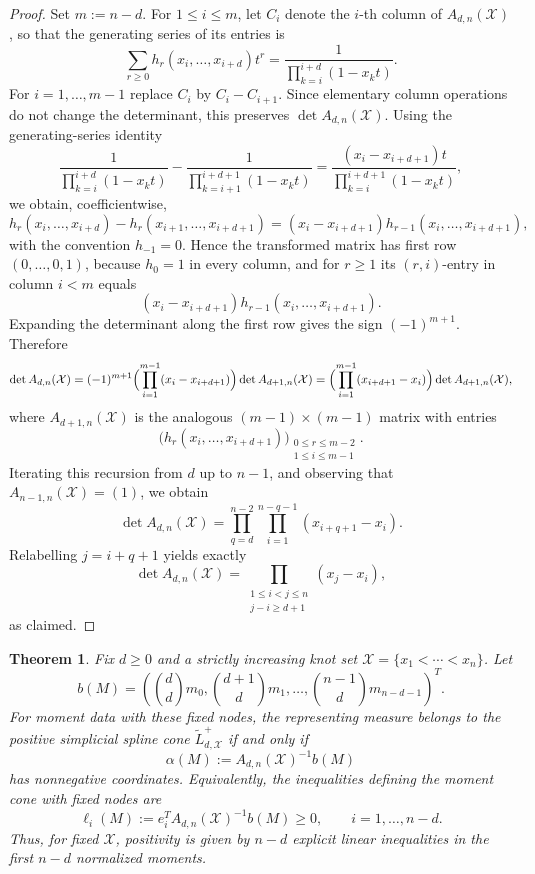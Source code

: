 \documentclass[reqno]{amsart}
\newtheorem{theorem}{Theorem}
\numberwithin{theorem}{section}
\newcommand{\cX}{\mathcal{X}}
\begin{document}
\begin{proof}
Set $m:=n-d$. For $1\le i\le m$, let $C_i$ denote the $i$-th column of $A_{d,n}(\cX)$, so that the generating series of its entries is
\[
\sum_{r\ge 0} h_r(x_i,\dots,x_{i+d})t^r
=
\frac{1}{\prod_{k=i}^{i+d}(1-x_kt)}.
\]
For $i=1,\dots,m-1$ replace $C_i$ by $C_i-C_{i+1}$. Since elementary column operations do not change the determinant, this preserves $\det A_{d,n}(\cX)$. Using the generating-series identity
\[
\frac{1}{\prod_{k=i}^{i+d}(1-x_kt)}-\frac{1}{\prod_{k=i+1}^{i+d+1}(1-x_kt)}
=
\frac{(x_i-x_{i+d+1})t}{\prod_{k=i}^{i+d+1}(1-x_kt)},
\]
we obtain, coefficientwise,
\[
 h_r(x_i,\dots,x_{i+d})-h_r(x_{i+1},\dots,x_{i+d+1})
 =(x_i-x_{i+d+1})h_{r-1}(x_i,\dots,x_{i+d+1}),
\]
with the convention $h_{-1}=0$.
Hence the transformed matrix has first row $(0,\dots,0,1)$, because $h_0=1$ in every column, and for $r\ge 1$ its $(r,i)$-entry in column $i<m$ equals
\[
(x_i-x_{i+d+1})h_{r-1}(x_i,\dots,x_{i+d+1}).
\]
Expanding the determinant along the first row gives the sign $(-1)^{m+1}$.  Therefore
\[
\det A_{d,n}(\cX)
=
(-1)^{m+1}\Bigl(\prod_{i=1}^{m-1}(x_i-x_{i+d+1})\Bigr)
\det A_{d+1,n}(\cX)
=
\Bigl(\prod_{i=1}^{m-1}(x_{i+d+1}-x_i)\Bigr)
\det A_{d+1,n}(\cX),
\]
where $A_{d+1,n}(\cX)$ is the analogous $(m-1)\times(m-1)$ matrix with entries
\[
\bigl(h_r(x_i,\dots,x_{i+d+1})\bigr)_{\substack{0\le r\le m-2\\ 1\le i\le m-1}}.
\]
Iterating this recursion from $d$ up to $n-1$, and observing that $A_{n-1,n}(\cX)=(1)$, we obtain
\[
\det A_{d,n}(\cX)
=
\prod_{q=d}^{n-2}\prod_{i=1}^{n-q-1}(x_{i+q+1}-x_i).
\]
Relabelling $j=i+q+1$ yields exactly
\[
\det A_{d,n}(\cX)
=
\prod_{\substack{1\le i<j\le n\\ j-i\ge d+1}} (x_j-x_i),
\]
as claimed.
\end{proof}

\begin{theorem}\label{th:moment-positivity-fixed-nodes}
Fix $d\ge 0$ and a strictly increasing knot set $\cX=\{x_1<\cdots <x_n\}$. Let
\[
b(M)=\left(\binom{d}{d}m_0,\binom{d+1}{d}m_1,
\dots,
\binom{n-1}{d}m_{n-d-1}\right)^T.
\]
For moment data with these fixed nodes, the representing measure belongs to the positive simplicial spline cone $\widetilde L_{d,\cX}^+$ if and only if
\[
\alpha(M):=A_{d,n}(\cX)^{-1}b(M)
\]
has nonnegative coordinates. Equivalently, the inequalities defining the moment cone with fixed nodes are
\[
\ell_i(M):=e_i^T A_{d,n}(\cX)^{-1}b(M)\ge 0,
\qquad i=1,\dots,n-d.
\]
Thus, for fixed $\cX$, positivity is given by $n-d$ explicit linear inequalities in the first $n-d$ normalized moments.
\end{theorem}
\end{document}
